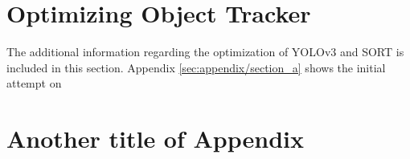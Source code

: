 \chapter{Optimizing Object Tracker}
The additional information regarding the optimization of YOLOv3 and SORT is included in this section. Appendix \ref{sec:appendix/section_a} shows the initial attempt on 





\chapter{Another title of Appendix}





